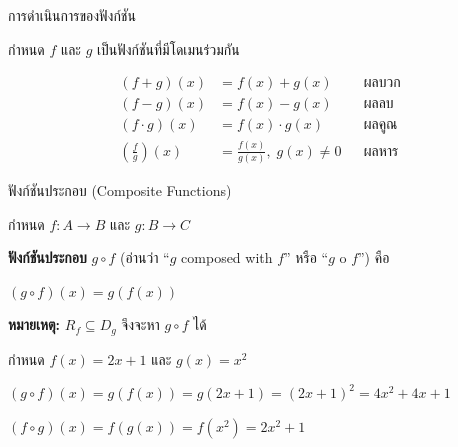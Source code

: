 \documentclass[11pt, aspectratio=169]{beamer}
\begin{document}
\begin{frame}{การดำเนินการของฟังก์ชัน}
  \begin{explanation}[นิยาม]
    กำหนด $f$ และ $g$ เป็นฟังก์ชันที่มีโดเมนร่วมกัน
  \end{explanation}

  \begin{align*}
    (f + g)(x) &= f(x) + g(x) &&\text{ผลบวก} \\
    (f - g)(x) &= f(x) - g(x) &&\text{ผลลบ} \\
    (f \cdot g)(x) &= f(x) \cdot g(x) &&\text{ผลคูณ} \\
    \left(\frac{f}{g}\right)(x) &= \frac{f(x)}{g(x)}, \; g(x) \neq 0 &&\text{ผลหาร}
  \end{align*}
\end{frame}

\begin{frame}{ฟังก์ชันประกอบ (Composite Functions)}
  \begin{explanation}[นิยาม]
    กำหนด $f: A \to B$ และ $g: B \to C$

    \medskip
    \textbf{ฟังก์ชันประกอบ} $g \circ f$ (อ่านว่า ``$g$ composed with $f$'' หรือ ``$g$ o $f$'') คือ

    \medskip
    $(g \circ f)(x) = g(f(x))$

    \medskip
    \textbf{หมายเหตุ:} $R_f \subseteq D_g$ จึงจะหา $g \circ f$ ได้
  \end{explanation}

  \begin{exambox}[ตัวอย่าง]
    กำหนด $f(x) = 2x + 1$ และ $g(x) = x^2$

    \medskip
    $(g \circ f)(x) = g(f(x)) = g(2x + 1) = (2x + 1)^2 = 4x^2 + 4x + 1$

    $(f \circ g)(x) = f(g(x)) = f(x^2) = 2x^2 + 1$
  \end{exambox}
\end{frame}
\end{document}
